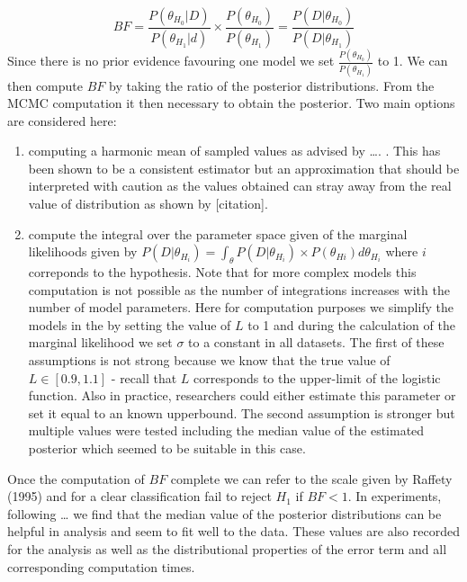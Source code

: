 \documentclass[]{article}
\begin{document}
\[BF =\frac {P(\theta_{H_0}|D)}{P(\theta_{H_1}|d)} \times \frac {P(\theta_{H_0})}{P(\theta_{H_1})} =\frac {P(D|\theta_{H_0})}{P(D|\theta_{H_1})}\]
Since there is no prior evidence favouring one model we set
\(\frac {P(\theta_{H_0})}{P(\theta_{H_1})}\) to 1. We can then compute
\(BF\) by taking the ratio of the posterior distributions. From the MCMC
computation it then necessary to obtain the posterior. Two main options
are considered here:

\begin{enumerate}
\def\labelenumi{(\roman{enumi})}
\item
  computing a harmonic mean of sampled values as advised by \ldots{}. .
  This has been shown to be a consistent estimator but an approximation
  that should be interpreted with caution as the values obtained can
  stray away from the real value of distribution as shown by
  {[}citation{]}.
\item
  compute the integral over the parameter space given of the marginal
  likelihoods given by
  \(P(D|\theta_{H_i}) = \int_\theta P(D|\theta_{H_i}) \times P(\theta_{Hi}) d\theta_{H_i}\)
  where \(i\) correponds to the hypothesis. Note that for more complex
  models this computation is not possible as the number of integrations
  increases with the number of model parameters. Here for computation
  purposes we simplify the models in the by setting the value of \(L\)
  to 1 and during the calculation of the marginal likelihood we set
  \(\sigma\) to a constant in all datasets. The first of these
  assumptions is not strong because we know that the true value of
  \(L \in [0.9, 1.1]\) - recall that \(L\) corresponds to the
  upper-limit of the logistic function. Also in practice, researchers
  could either estimate this parameter or set it equal to an known
  upperbound. The second assumption is stronger but multiple values were
  tested including the median value of the estimated posterior which
  seemed to be suitable in this case.
\end{enumerate}

Once the computation of \(BF\) complete we can refer to the scale given
by Raffety (1995) and for a clear classification fail to reject \(H_1\)
if \(BF < 1\). In experiments, following \ldots{} we find that the
median value of the posterior distributions can be helpful in analysis
and seem to fit well to the data. These values are also recorded for the
analysis as well as the distributional properties of the error term and
all corresponding computation times.
\end{document}
